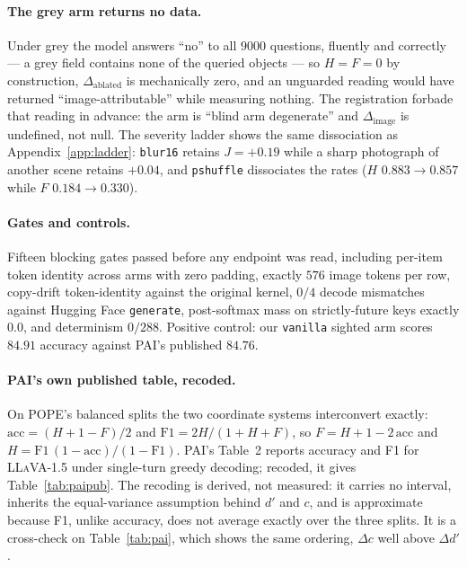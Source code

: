 \paragraph{The grey arm returns no data.} Under grey the model answers ``no'' to all $9000$
questions, fluently and correctly --- a grey field contains none of the queried objects --- so
$H = F = 0$ by construction, $\Delta_{\text{ablated}}$ is mechanically zero, and an unguarded reading
would have returned ``image-attributable'' while measuring nothing. The registration forbade
that reading in advance: the arm is ``blind arm degenerate'' and $\Delta_{\text{image}}$ is
undefined, not null. The severity ladder shows the same dissociation as Appendix~\ref{app:ladder}:
\texttt{blur16} retains $J = +0.19$ while a sharp photograph of another scene retains $+0.04$, and
\texttt{pshuffle} dissociates the rates ($H$ $0.883 \to 0.857$ while $F$ $0.184 \to 0.330$).

\paragraph{Gates and controls.} Fifteen blocking gates passed before any endpoint was read,
including per-item token identity across arms with zero padding, exactly $576$ image tokens per row,
copy-drift token-identity against the original kernel, $0/4$ decode mismatches against Hugging
Face \texttt{generate}, post-softmax mass on strictly-future keys exactly $0.0$, and determinism
$0/288$. Positive control: our \texttt{vanilla} sighted arm scores $84.91$ accuracy against PAI's
published $84.76$.

\paragraph{PAI's own published table, recoded.} On POPE's balanced splits the two coordinate systems
interconvert exactly: $\mathrm{acc} = (H + 1 - F)/2$ and $\mathrm{F1} = 2H/(1 + H + F)$, so
$F = H + 1 - 2\,\mathrm{acc}$ and $H = \mathrm{F1}\,(1 - \mathrm{acc})/(1 - \mathrm{F1})$. PAI's
Table~2 \citep{pai} reports accuracy and F1 for \textsc{LLaVA-1.5} under single-turn greedy decoding;
recoded, it gives Table~\ref{tab:paipub}. The recoding is derived, not measured: it carries no
interval, inherits the equal-variance assumption behind $d'$ and $c$, and is approximate because F1,
unlike accuracy, does not average exactly over the three splits. It is a cross-check on
Table~\ref{tab:pai}, which shows the same ordering, $\Delta c$ well above $\Delta d'$.

